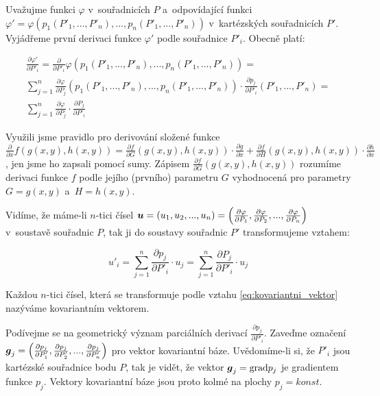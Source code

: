 Uvažujme funkci \(\varphi\) v~souřadnicích \(P\) a~odpovídající funkci \(\varphi' = \varphi(p_1(P'_1, ..., P'_n), ..., p_n(P'_1, ..., P'_n))\) v~kartézských souřadnicích \(P'\). Vyjádřeme první derivaci funkce \(\varphi'\) podle souřadnice \(P'_i\). Obecně platí:

\begin{equation}
\begin{split}
\frac{\partial \varphi'}{\partial P'_i} = \frac{\partial}{\partial P'_i} \varphi (p_1(P'_1, ..., P'_n), ..., p_n(P'_1, ..., P'_n)) = \\
\sum_{j=1}^n \frac{\partial \varphi}{\partial P_j} (p_1(P'_1, ..., P'_n), ..., p_n(P'_1, ..., P'_n)) \cdot \frac{\partial p_j}{\partial P'_i} (P'_1, ..., P'_n) = \\
\sum_{j=1}^n \frac{\partial \varphi}{\partial P_j} \cdot \frac{\partial P_j}{\partial P'_i}
\end{split}
\end{equation}

Využili jsme pravidlo pro derivování složené funkce \(\frac{\partial}{\partial x} f(g(x, y), h(x, y)) = \frac{\partial f}{\partial G}(g(x, y), h(x, y)) \cdot \frac{\partial g}{\partial x} + \frac{\partial f}{\partial H}(g(x, y), h(x, y)) \cdot \frac{\partial h}{\partial x}\), jen jsme ho zapsali pomocí sumy. Zápisem \(\frac{\partial f}{\partial G}(g(x, y), h(x, y))\) rozumíme derivaci funkce \(f\) podle jejího (prvního) parametru \(G\) vyhodnocená pro parametry \(G = g(x, y)\) a~\(H = h(x, y)\).

Vidíme, že máme-li \(n\)-tici čísel \(\boldsymbol{u} = (u_1, u_2, ..., u_n) = \left( \frac{\partial \varphi}{\partial P_1}, \frac{\partial \varphi}{\partial P_2}, ..., \frac{\partial \varphi}{\partial P_n} \right)\) v~soustavě souřadnic \(P\), tak ji do soustavy souřadnic \(P'\) transformujeme vztahem:

\begin{equation}
\label{eq:kovariantni_vektor}
u'_i = \sum_{j=1}^n \frac{\partial p_j}{\partial P'_i} \cdot u_j = \sum_{j=1}^n \frac{\partial P_j}{\partial P'_i} \cdot u_j
\end{equation}

Každou \(n\)-tici čísel, která se transformuje podle vztahu \eqref{eq:kovariantni_vektor} nazýváme kovariantním vektorem.

Podívejme se na geometrický význam parciálních derivací \(\frac{\partial p_j}{\partial P'_i}\). Zaveďme označení \(\boldsymbol{g}_j = \left(\frac{\partial p_j}{\partial P'_1}, \frac{\partial p_j}{\partial P'_2}, ..., \frac{\partial p_j}{\partial P'_n}\right)\) pro vektor kovariantní báze. Uvědomíme-li si, že \(P'_i\) jsou kartézské souřadnice bodu \(P\), tak je vidět, že vektor \(\boldsymbol{g}_j = \mathrm{grad} p_j\) je gradientem funkce \(p_j\). Vektory kovariantní báze jsou proto kolmé na plochy \(p_j = konst\).


